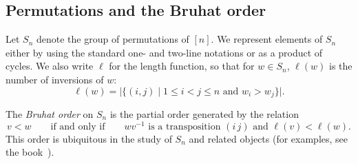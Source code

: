 \documentclass[submission]{FPSAC2024}
\theoremstyle{definition}
\theoremstyle{remark}
\numberwithin{equation}{section}
\begin{document}
%

\subsection{Permutations and the Bruhat order}
\label{sec:bruhat}

Let $S_n$ denote the group of permutations of $[n]$.  We represent elements of $S_{n}$ either by using the standard one- and two-line notations or as a product of cycles.  We also write $\ell$ for the length function, so that for $w \in S_{n}$, $\ell(w)$ is the number of inversions of $w$:
\[
\ell(w) = |\{(i, j) \;|\; \text{$1 \le i < j \le n$ and $w_{i} > w_{j}$}\}|.
\]

The \emph{Bruhat order} on $S_{n}$ is the partial order generated by the relation
\[
v < w \qquad\text{if and only if} \qquad \text{$wv^{-1}$ is a transposition $(i\,j)$ and $\ell(v) < \ell(w)$}.
\]
This order is ubiquitous in the study of $S_{n}$ and related objects (for examples, see the book~\cite{BjornerBrenti}).
\end{document}
